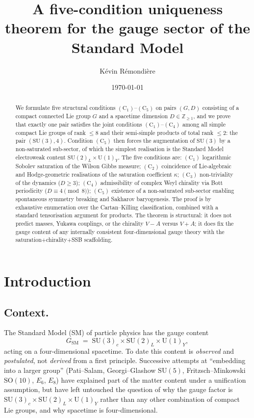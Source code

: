 \documentclass[11pt,reqno]{amsart}
\title[Five-condition uniqueness for SM gauge sector]{A five-condition uniqueness theorem for the gauge sector of the Standard Model}
\author{K\'evin R\'emondi\`ere}
\date{\today}
\theoremstyle{plain}
\theoremstyle{definition}
\theoremstyle{remark}
\newcommand{\bbZ}{\mathbb{Z}}
\newcommand{\SU}{\mathrm{SU}}
\newcommand{\Cone}{(\mathrm{C}_1)}
\newcommand{\Ctwo}{(\mathrm{C}_2)}
\newcommand{\Cthree}{(\mathrm{C}_3)}
\newcommand{\Cfour}{(\mathrm{C}_4)}
\newcommand{\Cfive}{(\mathrm{C}_5)}
\begin{document}
\begin{abstract}
We formulate five structural conditions $\Cone$--$\Cfive$ on pairs $(G, D)$ consisting of a compact connected Lie group $G$ and a spacetime dimension $D \in \bbZ_{\ge 1}$, and we prove that exactly one pair satisfies the joint conditions $\Cone$--$\Cfour$ among all simple compact Lie groups of rank $\le 8$ and their semi-simple products of total rank $\le 2$: the pair $(\SU(3), 4)$. Condition $\Cfive$ then forces the augmentation of $\SU(3)$ by a non-saturated sub-sector, of which the simplest realisation is the Standard Model electroweak content $\SU(2)_L \times \mathrm{U}(1)_Y$. The five conditions are: $\Cone$ logarithmic Sobolev saturation of the Wilson Gibbs measure; $\Ctwo$ coincidence of Lie-algebraic and Hodge-geometric realisations of the saturation coefficient $\kappa$; $\Cthree$ non-triviality of the dynamics ($D \ge 3$); $\Cfour$ admissibility of complex Weyl chirality via Bott periodicity ($D \equiv 4 \pmod 8$); $\Cfive$ existence of a non-saturated sub-sector enabling spontaneous symmetry breaking and Sakharov baryogenesis. The proof is by exhaustive enumeration over the Cartan--Killing classification, combined with a standard tensorisation argument for products. The theorem is structural: it does not predict masses, Yukawa couplings, or the chirality $V{-}A$ versus $V{+}A$; it does fix the gauge content of any internally consistent four-dimensional gauge theory with the saturation+chirality+SSB scaffolding.
\end{abstract}

\maketitle

\setcounter{tocdepth}{1}
\tableofcontents

\section{Introduction}
\label{sec:intro}

\subsection{Context.}
The Standard Model (SM) of particle physics has the gauge content
\[
  G_{\mathrm{SM}} \;=\; \SU(3)_c \times \SU(2)_L \times \mathrm{U}(1)_Y,
\]
acting on a four-dimensional spacetime. To date this content is \emph{observed} and \emph{postulated}, not \emph{derived} from a first principle. Successive attempts at ``embedding into a larger group'' (Pati--Salam, Georgi--Glashow $\SU(5)$, Fritzsch--Minkowski $\mathrm{SO}(10)$, $E_6$, $E_8$) have explained part of the matter content under a unification assumption, but have left untouched the question of why the gauge factor is $\SU(3)_c \times \SU(2)_L \times \mathrm{U}(1)_Y$ rather than any other combination of compact Lie groups, and why spacetime is four-dimensional.
\end{document}
